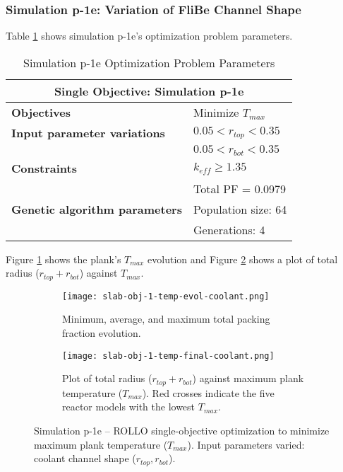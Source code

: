 \subsubsection{Simulation p-1e: Variation of FliBe Channel Shape}
Table \ref{tab:simulationp1e} shows simulation p-1e's optimization problem parameters. 
\begin{table}[htbp!]
    \centering
    \onehalfspacing
    \caption{Simulation p-1e Optimization Problem Parameters}
	\label{tab:simulationp1e}
    \footnotesize
    \begin{tabular}{l|p{3cm}}
    \hline 
    \multicolumn{2}{c}{\textbf{Single Objective: Simulation p-1e}} \\
    \hline 
    \textbf{Objectives} & Minimize $T_{max}$ \\
    \hline 
    \textbf{Input parameter variations} & $0.05<r_{top}<0.35$ \\
    & $0.05<r_{bot}<0.35$ \\
    \hline
    \textbf{Constraints} & $k_{eff} \geq 1.35$\\ 
    & Total PF = 0.0979\\
    \hline 
    \textbf{Genetic algorithm parameters} & Population size: 64 \\
    & Generations: 4 \\
    \hline
    \end{tabular}
\end{table}

Figure \ref{fig:slab-obj-1-temp-evol-coolant} shows the plank's $T_{max}$ evolution 
and Figure \ref{fig:slab-obj-1-temp-final-coolant} shows a plot of total radius 
($r_{top} + r_{bot}$) against $T_{max}$. 
\begin{figure}[htbp!]
    \centering
    \begin{subfigure}{\textwidth}
        \texttt{[image: slab-obj-1-temp-evol-coolant.png]}
        \caption{Minimum, average, and maximum total packing fraction evolution.}
        \label{fig:slab-obj-1-temp-evol-coolant} 
    \end{subfigure}
    \begin{subfigure}{\textwidth}
        \texttt{[image: slab-obj-1-temp-final-coolant.png]}
        \caption{Plot of total radius ($r_{top} + r_{bot}$) against maximum plank 
        temperature ($T_{max}$). Red crosses indicate the five reactor models with the 
        lowest $T_{max}$.}
        \label{fig:slab-obj-1-temp-final-coolant} 
    \end{subfigure}
    \caption{Simulation p-1e -- ROLLO single-objective optimization to minimize 
    maximum plank temperature ($T_{max}$). Input parameters varied: coolant channel shape 
    ($r_{top}, r_{bot}$).}
    \label{fig:slab-obj-1-temp-coolant}
\end{figure}

